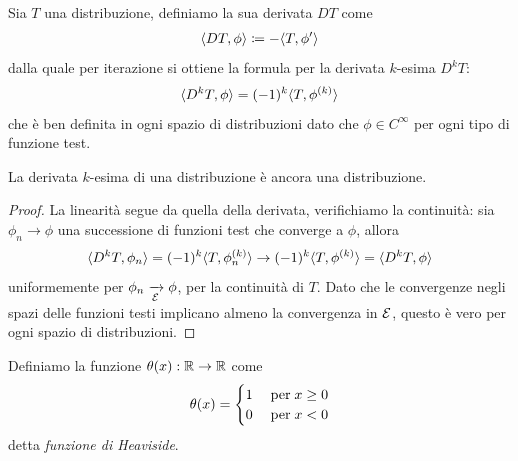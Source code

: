 \begin{definition}
  Sia $ T  $ una distribuzione, definiamo la sua derivata $ DT $ come 
  \begin{align}
    \sc{DT, \phi} \coloneq  - \sc{T, \phi'}
  \end{align}
  dalla quale per iterazione si ottiene la formula per la derivata $ k $-esima $ D^kT $:
  \begin{align}
    \sc{D^kT, \phi} = (-1)^k \sc{T, \phi^{(k)}}
  \end{align}
  che è ben definita in ogni spazio di distribuzioni dato che $ \phi \in C^\infty $ per ogni tipo di funzione test.
\end{definition}

\begin{lemma}[  ]
  La derivata $ k $-esima di una distribuzione è ancora una distribuzione. 
\end{lemma}
\begin{proof}
  La linearità segue da quella della derivata, verifichiamo la continuità: sia $ \phi_n \to \phi $ una successione di funzioni test che converge a 
  $ \phi $, allora
  \begin{align}
    \sc{D^kT, \phi_n} = (-1)^k \sc{T, \phi_n^{(k)}} \to (-1)^k \sc{T, \phi^{(k)}} = \sc{D^kT, \phi}
  \end{align}
  uniformemente per $ \phi_n \xrightarrow[\E]{} \phi $, per la continuità di $ T $. Dato che le convergenze negli spazi delle funzioni testi implicano 
  almeno la convergenza in $ \mathcal{E} $, questo è vero per ogni spazio di distribuzioni.
\end{proof}

\begin{definition}
  Definiamo la funzione $ \theta(x):\mathbb{R} \to \mathbb{R} $ come 
  \begin{align}
    \theta(x) = 
    \begin{cases}
      1 \; &\textnormal{per}\; x \geq 0
      \\
      0 \; &\textnormal{per}\; x < 0
    \end{cases}
  \end{align}
  detta \textit{funzione di Heaviside}.
\end{definition}

